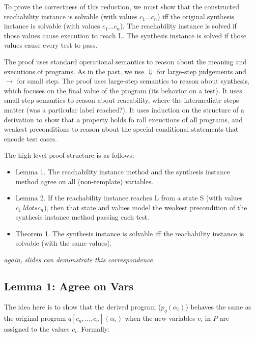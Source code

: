 \documentclass[11pt]{article}
\begin{document}
To prove the correctness of this reduction, we must show that the constructed
reachability instance is solvable (with values $c_1 \ldots c_n$) iff the original
synthesis instance is solvable (with values $c_1 \ldots c_n$).
The reachability instance is solved if those values cause execution to reach L. 
The synthesis instance is solved if those values cause every test to pass.

The proof uses standard operational semantics to reason about the meaning and
executions of programs.  As in the past, we use $\Downarrow$ for large-step
judgements and $\rightarrow$ for small step.  The proof uses large-step
semantics to reason about synthesis, which focuses on the final value of the
program (its behavior on a test).  It uses small-step semantics to reason about
reacability, where the intermediate steps matter (was a particular label
reached?).  It uses induction on the structure of a derivation to show that a
property holds fo rall exeuctions of all programs, and weakest preconditions
to reason about the special conditional statements that encode test cases.  

The high-level proof structure is as follows:
\begin{itemize}
\item Lemma 1. The reachability instance method and the synthesis instance
  method agree on all (non-template) variables.  
\item Lemma 2. If the reachability instance reaches L from a state S (with
  values $c_1\ ldots c_n$), then that state and values model the weakest precondition of
  the synthesis instance method passing each test. 
\item Theorem 1. The synthesis instance is solvable iff the reachability
  instance is solvable (with the same values). 
\end{itemize}

\vspace{1ex}
\emph{again, slides can demonstrate this correspondence.} 



\subsection{Lemma 1: Agree on Vars}

The idea here is to show that the derived program ($p_q(\alpha_i)$) behaves the
same as the original program $q[c_q,...,c_n](\alpha_i)$ when the new variables $v_i$ in $P$ are
assigned to the values $c_i$.  Formally:
\end{document}
